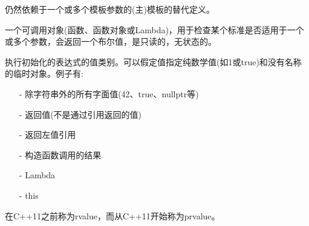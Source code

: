 


仍然依赖于一个或多个模板参数的(主)模板的替代定义。


一个可调用对象(函数、函数对象或Lambda)，用于检查某个标准是否适用于一个或多个参数，会返回一个布尔值，是只读的，无状态的。


执行初始化的表达式的值类别。可以假定值指定纯数学值(如1或true)和没有名称的临时对象。例子有:

\begin{itemize}
\item [-]
除字符串外的所有字面值(42、true、nullptr等)

\item [-]
返回值(不是通过引用返回的值)

\item [-]
返回左值引用

\item [-]
构造函数调用的结果

\item [-]
Lambda

\item [-]
this
\end{itemize}

在C++11之前称为rvalue，而从C++11开始称为prvalue。








